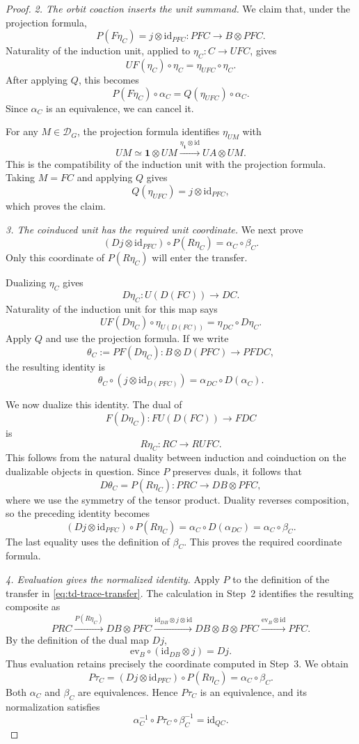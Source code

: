 \documentclass[11pt,reqno]{amsart}
\theoremstyle{definition}
\theoremstyle{remark}
\theoremstyle{plain}
\numberwithin{equation}{section}
\newcommand{\one}{\mathbf 1}
\newcommand{\D}{\mathcal D}
\begin{document}
\begin{proof}
\smallskip
\noindent
\emph{2. The orbit coaction inserts the unit summand.}
We claim that, under the projection formula,
\[
 P(F\eta_C)=j\otimes\mathrm{id}_{PFC}:
 PFC\longrightarrow B\otimes PFC.
\]
Naturality of the induction unit, applied to
\(\eta_C:C\to UFC\), gives
\[
 UF(\eta_C)\circ\eta_C
 =
 \eta_{UFC}\circ\eta_C.
\]
After applying \(Q\), this becomes
\[
 P(F\eta_C)\circ\alpha_C
 =
 Q(\eta_{UFC})\circ\alpha_C.
\]
Since \(\alpha_C\) is an equivalence, we can cancel it.

For any \(M\in\D_G\), the projection formula identifies
\(\eta_{UM}\) with
\[
 UM\simeq\one\otimes UM
 \xrightarrow{\eta_{\one}\otimes\mathrm{id}}
 UA\otimes UM.
\]
This is the compatibility of the induction unit with the
projection formula. Taking \(M=FC\) and applying \(Q\) gives
\[
 Q(\eta_{UFC})=j\otimes\mathrm{id}_{PFC},
\]
which proves the claim.

\smallskip
\noindent
\emph{3. The coinduced unit has the required unit coordinate.}
We next prove
\[
 (Dj\otimes\mathrm{id}_{PFC})\circ P(R\eta_C)
 =
 \alpha_C\circ\beta_C.
\]
Only this coordinate of \(P(R\eta_C)\) will enter the transfer.

Dualizing \(\eta_C\) gives
\[
 D\eta_C:U(D(FC))\longrightarrow DC.
\]
Naturality of the induction unit for this map says
\[
 UF(D\eta_C)\circ\eta_{U(D(FC))}
 =
 \eta_{DC}\circ D\eta_C.
\]
Apply \(Q\) and use the projection formula. If we write
\[
 \theta_C:=PF(D\eta_C):
 B\otimes D(PFC)\longrightarrow PFDC,
\]
the resulting identity is
\[
 \theta_C\circ
 (j\otimes\mathrm{id}_{D(PFC)})
 =
 \alpha_{DC}\circ D(\alpha_C).
\]

We now dualize this identity.
The dual of
\[
 F(D\eta_C):FU(D(FC))\longrightarrow FDC
\]
is
\[
 R\eta_C:RC\longrightarrow RUFC.
\]
This follows from the natural duality between induction and
coinduction on the dualizable objects in question.
Since \(P\) preserves duals, it follows that
\[
 D\theta_C=P(R\eta_C):
 PRC\longrightarrow DB\otimes PFC,
\]
where we use the symmetry of the tensor product.
Duality reverses composition, so the preceding identity becomes
\[
 (Dj\otimes\mathrm{id}_{PFC})\circ P(R\eta_C)
 =
 \alpha_C\circ D(\alpha_{DC})
 =
 \alpha_C\circ\beta_C.
\]
The last equality uses the definition of \(\beta_C\).
This proves the required coordinate formula.

\smallskip
\noindent
\emph{4. Evaluation gives the normalized identity.}
Apply \(P\) to the definition of the transfer in
\eqref{eq:td-trace-transfer}.
The calculation in Step~2 identifies the resulting composite as
\[
 PRC
 \xrightarrow{P(R\eta_C)}
 DB\otimes PFC
 \xrightarrow{\mathrm{id}_{DB}\otimes j\otimes\mathrm{id}}
 DB\otimes B\otimes PFC
 \xrightarrow{\mathrm{ev}_B\otimes\mathrm{id}}
 PFC.
\]
By the definition of the dual map \(Dj\),
\[
 \mathrm{ev}_B\circ(\mathrm{id}_{DB}\otimes j)=Dj.
\]
Thus evaluation retains precisely the coordinate computed in
Step~3. We obtain
\[
 P\tau_C
 =
 (Dj\otimes\mathrm{id}_{PFC})\circ P(R\eta_C)
 =
 \alpha_C\circ\beta_C.
\]
Both \(\alpha_C\) and \(\beta_C\) are equivalences. Hence
\(P\tau_C\) is an equivalence, and its normalization satisfies
\[
 \alpha_C^{-1}\circ P\tau_C\circ\beta_C^{-1}
 =
 \mathrm{id}_{QC}.
\]


\end{proof}
\end{document}
